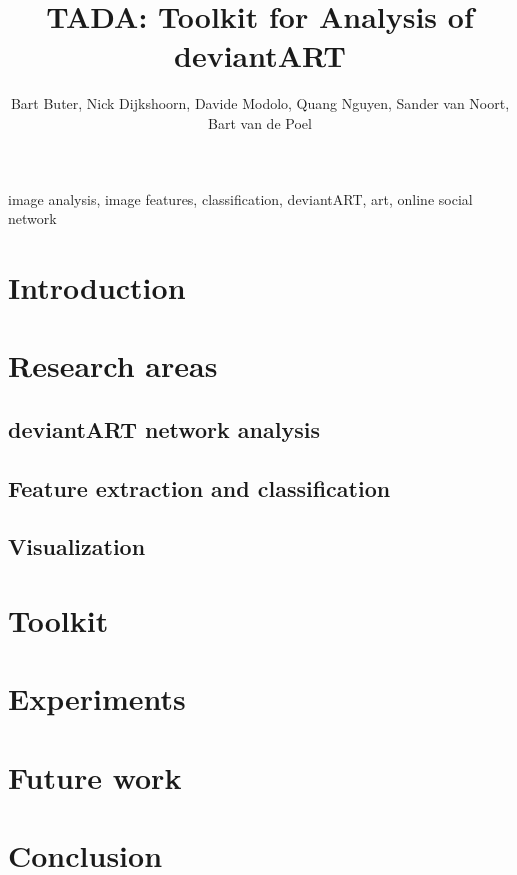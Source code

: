 \documentclass[10pt,journal,compsoc]{IEEEtran}
\begin{document}
\title{TADA: Toolkit for Analysis of deviantART}
\author{Bart Buter, Nick Dijkshoorn, Davide Modolo, Quang Nguyen, Sander van Noort, Bart van de Poel}

\maketitle

\begin{abstract}

\end{abstract}


\begin{keywords}
image analysis, image features, classification, deviantART, art, online social network
\end{keywords}


\section{Introduction \label{intro}}



\section{Research areas \label{research_area}}
	\subsection{deviantART network analysis \label{net}}
	
	\subsection{Feature extraction and classification \label {feat_class}}
	
	\subsection{Visualization \label{visualiz}}
	


\section{Toolkit \label{toolkit}}


\section{Experiments \label{exp}}



\section{Future work \label{future_work}}


\section{Conclusion \label{conclusion}}


%



\end{document}
